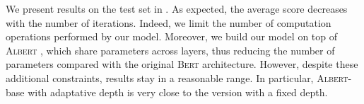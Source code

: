 \begin{table}[!htb]
\small
\caption{GLUE Test results, scored by the evaluation server but without the WNLI task. To facilitate the comparison, we reproduce \textsc{Bert} and \textsc{Albert}, with our pre-training dataset, infrastructure and configuration detailed in .}
\end{table}


We present results on the test set in . As expected, the average score decreases with the number of iterations. Indeed, we limit the number of computation operations performed by our model. Moreover, we build our model on top of \textsc{Albert} , which share parameters across layers, thus reducing the number of parameters compared with the original \textsc{Bert}  architecture. However, despite these additional constraints, results stay in a reasonable range. In particular, \textsc{Albert}-base with adaptative depth is very close to the version with a fixed depth. 


